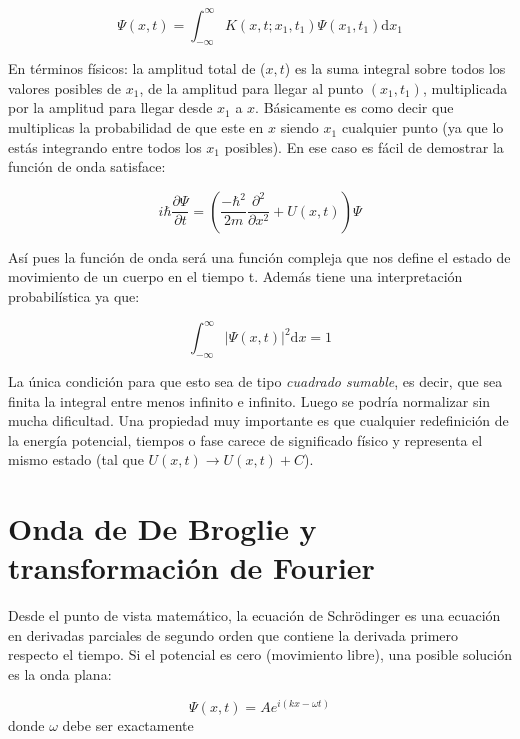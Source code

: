 \documentclass[12pt,a4paper]{article}
\numberwithin{equation}{section}
\numberwithin{figure}{section}
\newcommand{\parentesis}[1]{\left( #1  \right)}
\newcommand{\parciales}[2]{\frac{\partial #1}{\partial #2}}
\newcommand{\D}{\mathrm{d}}
\newcommand{\intf}{\int_{-\infty}^{\infty}}
\begin{document}
\begin{equation}
\Psi (x,t) = \int_{-\infty}^\infty K(x,t;x_1,t_1) \Psi (x_1,t_1) \D x_1
\end{equation}

En términos físicos: la amplitud total de ($x,t$) es la suma integral sobre todos los valores posibles de $x_1$, de la amplitud para llegar al punto $(x_1,t_1)$, multiplicada por la amplitud para llegar desde $x_1$ a $x$. Básicamente es como decir que multiplicas la probabilidad de que este en $x$ siendo $x_1$ cualquier punto (ya que lo estás integrando entre todos los $x_1$ posibles). En ese caso es fácil de demostrar la función de onda satisface:

\begin{equation}
i \hbar \parciales{\Psi}{t} = \parentesis{\dfrac{- \hbar^2}{2m} \parciales{^2}{x^2} + U(x,t)}\Psi
\end{equation}

Así pues la función de onda será una función compleja que nos define el estado de movimiento de un cuerpo en el tiempo t. Además tiene una interpretación probabilística ya que:

\begin{equation}
\intf |\Psi (x,t)|^2 \D x = 1
\end{equation}

La única condición para que esto sea de tipo \textit{cuadrado sumable}, es decir, que sea finita la integral entre menos infinito e infinito. Luego se podría normalizar sin mucha dificultad. Una propiedad muy importante es que cualquier redefinición de la energía potencial, tiempos o fase carece de significado físico y representa el mismo estado (tal que $U(x,t) \rightarrow U(x,t) + C$).

\section{Onda de De Broglie y transformación de Fourier}

Desde el punto de vista matemático, la ecuación de Schrödinger es una ecuación en derivadas parciales de segundo orden que contiene la derivada primero respecto el tiempo. Si el potencial es cero (movimiento libre), una posible solución es la onda plana:

\begin{equation}
\Psi (x,t) = A e^{i(kx-\omega t) } \label{Ec:7-ondaplana}
\end{equation}
donde $\omega$ debe ser exactamente
\end{document}
